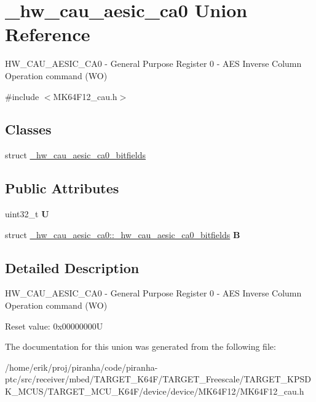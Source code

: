 \hypertarget{union__hw__cau__aesic__ca0}{}\section{\+\_\+hw\+\_\+cau\+\_\+aesic\+\_\+ca0 Union Reference}
\label{union__hw__cau__aesic__ca0}


H\+W\+\_\+\+C\+A\+U\+\_\+\+A\+E\+S\+I\+C\+\_\+\+C\+A0 -\/ General Purpose Register 0 -\/ A\+ES Inverse Column Operation command (WO)  




{\ttfamily \#include $<$M\+K64\+F12\+\_\+cau.\+h$>$}

\subsection*{Classes}
\begin{DoxyCompactItemize}
\item 
struct \hyperlink{struct__hw__cau__aesic__ca0_1_1__hw__cau__aesic__ca0__bitfields}{\+\_\+hw\+\_\+cau\+\_\+aesic\+\_\+ca0\+\_\+bitfields}
\end{DoxyCompactItemize}
\subsection*{Public Attributes}
\begin{DoxyCompactItemize}
\item 
uint32\+\_\+t {\bfseries U}\hypertarget{union__hw__cau__aesic__ca0_a8567efb225f1c5c66494de721fdf5a00}{}\label{union__hw__cau__aesic__ca0_a8567efb225f1c5c66494de721fdf5a00}

\item 
struct \hyperlink{struct__hw__cau__aesic__ca0_1_1__hw__cau__aesic__ca0__bitfields}{\+\_\+hw\+\_\+cau\+\_\+aesic\+\_\+ca0\+::\+\_\+hw\+\_\+cau\+\_\+aesic\+\_\+ca0\+\_\+bitfields} {\bfseries B}\hypertarget{union__hw__cau__aesic__ca0_aab66cb442439b7dd743a6f34186e260a}{}\label{union__hw__cau__aesic__ca0_aab66cb442439b7dd743a6f34186e260a}

\end{DoxyCompactItemize}


\subsection{Detailed Description}
H\+W\+\_\+\+C\+A\+U\+\_\+\+A\+E\+S\+I\+C\+\_\+\+C\+A0 -\/ General Purpose Register 0 -\/ A\+ES Inverse Column Operation command (WO) 

Reset value\+: 0x00000000U 

The documentation for this union was generated from the following file\+:\begin{DoxyCompactItemize}
\item 
/home/erik/proj/piranha/code/piranha-\/ptc/src/receiver/mbed/\+T\+A\+R\+G\+E\+T\+\_\+\+K64\+F/\+T\+A\+R\+G\+E\+T\+\_\+\+Freescale/\+T\+A\+R\+G\+E\+T\+\_\+\+K\+P\+S\+D\+K\+\_\+\+M\+C\+U\+S/\+T\+A\+R\+G\+E\+T\+\_\+\+M\+C\+U\+\_\+\+K64\+F/device/device/\+M\+K64\+F12/M\+K64\+F12\+\_\+cau.\+h\end{DoxyCompactItemize}

